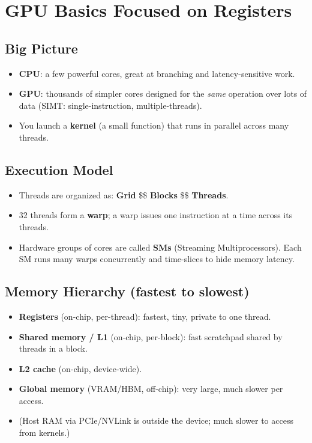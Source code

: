 \section{GPU Basics Focused on Registers}

\subsection{Big Picture}
\begin{itemize}
\item \textbf{CPU}: a few powerful cores, great at branching and latency-sensitive work.
\item \textbf{GPU}: thousands of simpler cores designed for the \emph{same} operation over lots of data (SIMT: single-instruction, multiple-threads).
\item You launch a \textbf{kernel} (a small function) that runs in parallel across many threads.
\end{itemize}

\subsection{Execution Model}
\begin{itemize}
\item Threads are organized as: \textbf{Grid} \$\rightarrow\$ \textbf{Blocks} \$\rightarrow\$ \textbf{Threads}.
\item 32 threads form a \textbf{warp}; a warp issues one instruction at a time across its threads.
\item Hardware groups of cores are called \textbf{SMs} (Streaming Multiprocessors). Each SM runs many warps concurrently and time-slices to hide memory latency.
\end{itemize}

\subsection{Memory Hierarchy (fastest to slowest)}
\begin{itemize}
\item \textbf{Registers} (on-chip, per-thread): fastest, tiny, private to one thread.
\item \textbf{Shared memory / L1} (on-chip, per-block): fast scratchpad shared by threads in a block.
\item \textbf{L2 cache} (on-chip, device-wide).
\item \textbf{Global memory} (VRAM/HBM, off-chip): very large, much slower per access.
\item (Host RAM via PCIe/NVLink is outside the device; much slower to access from kernels.)
\end{itemize}

